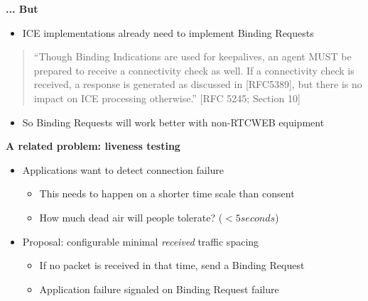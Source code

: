 \documentclass[helvetica]{seminar}
\newcommand{\heading}[1]{%
  \begin{center} 
    \large\bf 
    #1 
  \end{center} 
  \vspace{.4 in}}
\begin{document}
\begin{slide}
\heading{... But}

\begin{itemize}
\item ICE implementations already need to implement Binding Requests
\end{itemize}

\begin{quote}
``Though Binding Indications are used for keepalives,
an agent MUST be prepared to receive a connectivity check as well.
If a connectivity check is received, a response is generated as
discussed in [RFC5389], but there is no impact on ICE processing
otherwise.'' [RFC 5245; Section 10]
\end{quote}

\begin{itemize}
\item So Binding Requests will work better with non-RTCWEB equipment
\end{itemize}
\end{slide}



\begin{slide}
\heading{A related problem: liveness testing}

\begin{itemize}
\item Applications want to detect connection failure
  \begin{itemize}
  \item This needs to happen on a shorter time scale than consent
  \item How much dead air will people tolerate? ($< 5 seconds$)
  \end{itemize}

\item Proposal: configurable minimal \emph{received} traffic spacing
  \begin{itemize}
  \item If no packet is received in that time, send a Binding Request
  \item Application failure signaled on Binding Request failure
  \end{itemize}
\end{itemize}
\end{slide}
\end{document}
